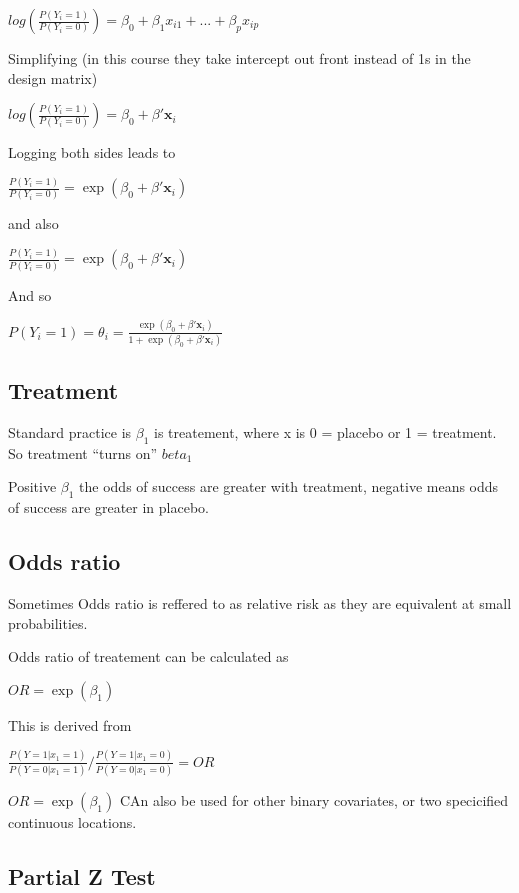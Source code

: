 \documentclass[
  letterpaper,
  DIV=11,
  numbers=noendperiod]{scrreprt}
\begin{document}
\(log(\frac{P(Y_i = 1)}{P(Y_i = 0)}) = \beta_0 + \beta_1x_{i1} + ... + \beta_px_{ip}\)

Simplifying (in this course they take intercept out front instead of 1s
in the design matrix)

\(log(\frac{P(Y_i = 1)}{P(Y_i = 0)}) = \beta_0 + \beta'\mathbf{x}_i\)

Logging both sides leads to

\(\frac{P(Y_i = 1)}{P(Y_i = 0)} = \exp(\beta_0 + \beta'\mathbf{x}_i)\)

and also

\(\frac{P(Y_i = 1)}{P(Y_i = 0)} = \exp(\beta_0 + \beta'\mathbf{x}_i)\)

And so

\(P(Y_i = 1)= \theta_i = \frac{\exp(\beta_0 + \beta'\mathbf{x}_i)}{1+\exp(\beta_0 + \beta'\mathbf{x}_i)}\)

\hypertarget{treatment}{%
\subsection{Treatment}\label{treatment}}

Standard practice is \(\beta_1\) is treatement, where x is 0 = placebo
or 1 = treatment. So treatment ``turns on'' \(beta_1\)

Positive \(\beta_1\) the odds of success are greater with treatment,
negative means odds of success are greater in placebo.

\hypertarget{odds-ratio}{%
\subsection{Odds ratio}\label{odds-ratio}}

Sometimes Odds ratio is reffered to as relative risk as they are
equivalent at small probabilities.

Odds ratio of treatement can be calculated as

\(OR = \exp(\beta_1)\)

This is derived from

\(\frac{P(Y=1|x_1 = 1)}{P(Y=0|x_1 = 1)}/ \frac{P(Y=1|x_1 = 0)}{P(Y=0|x_1 = 0)} = OR\)

\(OR = \exp(\beta_1)\) CAn also be used for other binary covariates, or
two specicified continuous locations.

\hypertarget{partial-z-test}{%
\subsection{Partial Z Test}\label{partial-z-test}}
\end{document}
